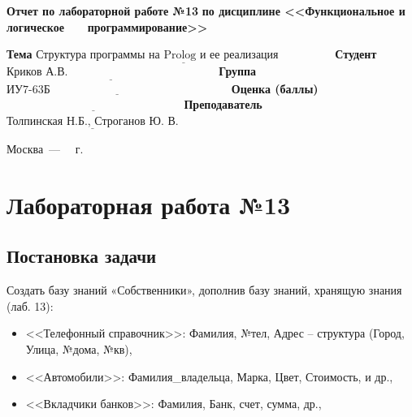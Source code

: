 \documentclass[12pt]{report}
\begin{document}
\begin{titlepage}
		\begin{center}
			\noindent\begin{minipage}{1.1\textwidth}\centering
				\Large\textbf{  Отчет по лабораторной работе №13}\newline
				\textbf{по дисциплине <<Функциональное и логическое}\newline
				\textbf{~~~программирование>>}\newline\newline
			\end{minipage}
		\end{center}
		
		\noindent\textbf{Тема} $\underline{\text{Структура программы на Prolog и ее реализация~~~~~~~~~~~~~~}}$\newline\newline
		\noindent\textbf{Студент} $\underline{\text{Криков А.В.~~~~~~~~~~~~~~~~~~~~~~~~~~~~~~~~~~~~~~~}}$\newline\newline
		\noindent\textbf{Группа} $\underline{\text{ИУ7-63Б~~~~~~~~~~~~~~~~~~~~~~~~~~~~~~~~~~~~~~~~~~~~~~~}}$\newline\newline
		\noindent\textbf{Оценка (баллы)} $\underline{\text{~~~~~~~~~~~~~~~~~~~~~~~~~~~~~~~~~~~~~~~~~~~~~~}}$\newline\newline
		\noindent\textbf{Преподаватель} $\underline{\text{Толпинская Н.Б., Строганов Ю. В.}}$\newline\newline\newline
		
		\begin{center}
			\vfill
			Москва~---~\the\year
			~г.
		\end{center}
	\end{titlepage}
	

\chapter*{Лабораторная работа №13}
\section*{Постановка задачи}
Создать базу знаний «Собственники», дополнив базу знаний, хранящую знания (лаб. 13):

\begin{itemize}
	\item <<Телефонный справочник>>: Фамилия, №тел, Адрес – структура (Город, Улица, №дома, №кв),
	\item <<Автомобили>>: Фамилия\_владельца, Марка, Цвет, Стоимость, и др.,
	\item <<Вкладчики банков>>: Фамилия, Банк, счет, сумма, др.,
\end{itemize}
\end{document}
